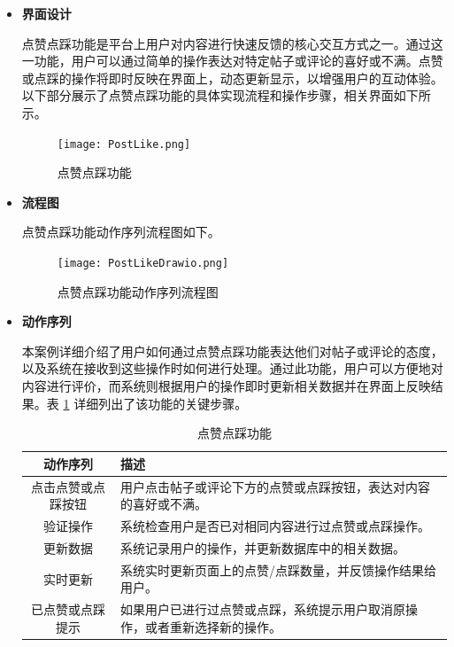 \begin{itemize}
	\item \textbf{界面设计}
	
	点赞点踩功能是平台上用户对内容进行快速反馈的核心交互方式之一。通过这一功能，用户可以通过简单的操作表达对特定帖子或评论的喜好或不满。点赞或点踩的操作将即时反映在界面上，动态更新显示，以增强用户的互动体验。以下部分展示了点赞点踩功能的具体实现流程和操作步骤，相关界面如下所示。
	
	\begin{figure}[H]
		\centering
		\texttt{[image: PostLike.png]} 
		\caption{点赞点踩功能}
		\label{fig:post-like}
	\end{figure}
	
	\item \textbf{流程图}
	
	点赞点踩功能动作序列流程图如下。
	
	\begin{figure}[H]
		\centering
		\texttt{[image: PostLikeDrawio.png]} 
		\caption{点赞点踩功能动作序列流程图}
		\label{fig:post-like.drawio}
	\end{figure}
	
	\item \textbf{动作序列}
	
	本案例详细介绍了用户如何通过点赞点踩功能表达他们对帖子或评论的态度，以及系统在接收到这些操作时如何进行处理。通过此功能，用户可以方便地对内容进行评价，而系统则根据用户的操作即时更新相关数据并在界面上反映结果。表 \ref{table:post-like} 详细列出了该功能的关键步骤。
	
	\begin{table}[H]
		\centering
		\caption{点赞点踩功能}
		\renewcommand\arraystretch{1.5}
		\begin{tabular}{|c|>{\raggedright\arraybackslash}p{8cm}|}
			\hline
			\textbf{动作序列} & \textbf{描述} \\ \hline
			点击点赞或点踩按钮 & 用户点击帖子或评论下方的点赞或点踩按钮，表达对内容的喜好或不满。 \\ \hline
			验证操作 & 系统检查用户是否已对相同内容进行过点赞或点踩操作。 \\ \hline
			更新数据 & 系统记录用户的操作，并更新数据库中的相关数据。 \\ \hline
			实时更新 & 系统实时更新页面上的点赞/点踩数量，并反馈操作结果给用户。 \\ \hline
			已点赞或点踩提示 & 如果用户已进行过点赞或点踩，系统提示用户取消原操作，或者重新选择新的操作。 \\ \hline
		\end{tabular}
		\label{table:post-like}
	\end{table}
	

\end{itemize}
